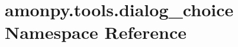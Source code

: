 \hypertarget{namespaceamonpy_1_1tools_1_1dialog__choice}{\section{amonpy.\-tools.\-dialog\-\_\-choice Namespace Reference}
\label{namespaceamonpy_1_1tools_1_1dialog__choice}
}
